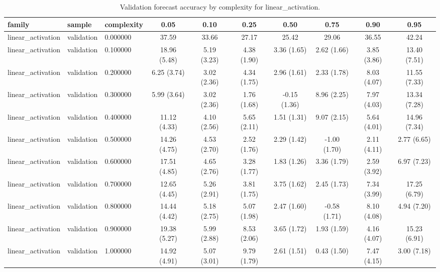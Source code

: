 \begin{table}
\caption{Validation forecast accuracy by complexity for linear_activation.}
\label{tab:validation_linear_activation}
\begin{tabular}{lllccccccc}
\toprule
family & sample & complexity & 0.05 & 0.10 & 0.25 & 0.50 & 0.75 & 0.90 & 0.95 \\
\midrule
linear_activation & validation & 0.000000 & 37.59 & 33.66 & 27.17 & 25.42 & 29.06 & 36.55 & 42.24 \\
linear_activation & validation & 0.100000 & 18.96
(5.48) & 5.19
(3.23) & 4.38
(1.90) & 3.36
(1.65) & 2.62
(1.66) & 3.85
(3.86) & 13.40
(7.51) \\
linear_activation & validation & 0.200000 & 6.25
(3.74) & 3.02
(2.36) & 4.34
(1.75) & 2.96
(1.61) & 2.33
(1.78) & 8.03
(4.07) & 11.55
(7.33) \\
linear_activation & validation & 0.300000 & 5.99
(3.64) & 3.02
(2.36) & 1.76
(1.68) & -0.15
(1.36) & 8.96
(2.25) & 7.97
(4.03) & 13.34
(7.28) \\
linear_activation & validation & 0.400000 & 11.12
(4.33) & 4.10
(2.56) & 5.65
(2.11) & 1.51
(1.31) & 9.07
(2.15) & 5.64
(4.01) & 14.96
(7.34) \\
linear_activation & validation & 0.500000 & 14.26
(4.75) & 4.53
(2.70) & 2.52
(1.76) & 2.29
(1.42) & -1.00
(1.70) & 2.11
(4.11) & 2.77
(6.65) \\
linear_activation & validation & 0.600000 & 17.51
(4.85) & 4.65
(2.76) & 3.28
(1.77) & 1.83
(1.26) & 3.36
(1.79) & 2.59
(3.92) & 6.97
(7.23) \\
linear_activation & validation & 0.700000 & 12.65
(4.45) & 5.26
(2.91) & 3.81
(1.75) & 3.75
(1.62) & 2.45
(1.73) & 7.34
(3.99) & 17.25
(6.79) \\
linear_activation & validation & 0.800000 & 14.44
(4.42) & 5.18
(2.75) & 5.07
(1.98) & 2.47
(1.60) & -0.58
(1.71) & 8.10
(4.08) & 4.94
(7.20) \\
linear_activation & validation & 0.900000 & 19.38
(5.27) & 5.99
(2.88) & 8.53
(2.06) & 3.65
(1.72) & 1.93
(1.59) & 4.16
(4.07) & 15.23
(6.91) \\
linear_activation & validation & 1.000000 & 14.92
(4.91) & 5.07
(3.01) & 9.79
(1.79) & 2.61
(1.51) & 0.43
(1.50) & 7.47
(4.15) & 3.00
(7.18) \\
\bottomrule
\end{tabular}
\end{table}
